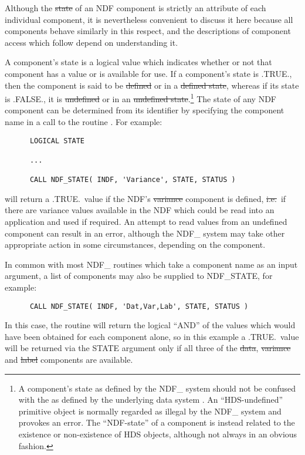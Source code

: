 Although the \st{state\/} of an NDF component is strictly an attribute of
each individual component, it is nevertheless convenient to discuss it here
because all components behave similarly in this respect, and the
descriptions of component access which follow depend on understanding it. 

A component's state is a logical value which indicates whether or not that 
component has a value or is available for use.
If a component's state is .TRUE., then the component is said to be
\st{defined\/} or in a \st{defined state}, whereas if its state is
.FALSE., it is 
\st{undefined\/} or in an \st{undefined state}.\footnote{A
component's state as defined by the NDF\_ system should not be
confused with the  as
defined by the underlying data system . An
``HDS-undefined'' primitive object is normally regarded as illegal by
the NDF\_ system and provokes an error.
The ``NDF-state'' of a component is instead related to the existence
or non-existence of HDS objects, although not always in an obvious
fashion.}
The state of any NDF component can be determined from its identifier by 
specifying the component name in a call to the routine .
For example:

\small
\begin{verbatim}
      LOGICAL STATE

      ...

      CALL NDF_STATE( INDF, 'Variance', STATE, STATUS )
\end{verbatim}
\normalsize

will return a .TRUE.\ value if the NDF's \st{variance\/} component is defined,
\st{i.e.}\ if there are variance values available in the NDF which could be read
into an application and used if required. 
An attempt to read values from an undefined component can result in an
error, although the NDF\_ system may take other appropriate action in some
circumstances, depending on the component. 

In common with most NDF\_ routines which take a component name as an input
argument, a list of components may also be supplied to NDF\_STATE, for
example: 

\small
\begin{verbatim}
      CALL NDF_STATE( INDF, 'Dat,Var,Lab', STATE, STATUS )
\end{verbatim}
\normalsize

In this case, the routine will return the logical ``AND'' of the values
which would have been obtained for each component alone, so in this example
a .TRUE.\ value will be returned via the STATE argument only if all three of
the \st{data}, \st{variance\/} and \st{label\/} components are available. 

